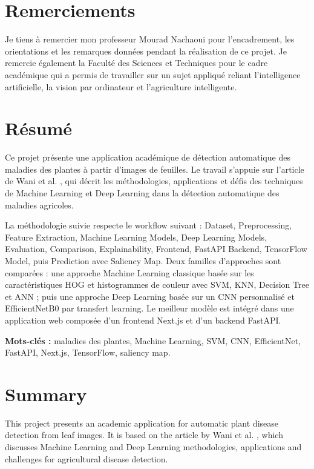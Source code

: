 \documentclass[12pt,a4paper]{report}
\begin{document}
\chapter*{Remerciements}

Je tiens à remercier mon professeur Mourad Nachaoui pour l'encadrement, les orientations et les remarques données pendant la réalisation de ce projet. Je remercie également la Faculté des Sciences et Techniques pour le cadre académique qui a permis de travailler sur un sujet appliqué reliant l'intelligence artificielle, la vision par ordinateur et l'agriculture intelligente.

\chapter*{Résumé}

Ce projet présente une application académique de détection automatique des maladies des plantes à partir d'images de feuilles. Le travail s'appuie sur l'article de Wani et al. \cite{wani2021}, qui décrit les méthodologies, applications et défis des techniques de Machine Learning et Deep Learning dans la détection automatique des maladies agricoles.

La méthodologie suivie respecte le workflow suivant : Dataset, Preprocessing, Feature Extraction, Machine Learning Models, Deep Learning Models, Evaluation, Comparison, Explainability, Frontend, FastAPI Backend, TensorFlow Model, puis Prediction avec Saliency Map. Deux familles d'approches sont comparées : une approche Machine Learning classique basée sur les caractéristiques HOG et histogrammes de couleur avec SVM, KNN, Decision Tree et ANN ; puis une approche Deep Learning basée sur un CNN personnalisé et EfficientNetB0 par transfert learning. Le meilleur modèle est intégré dans une application web composée d'un frontend Next.js et d'un backend FastAPI.

\textbf{Mots-clés :} maladies des plantes, Machine Learning, SVM, CNN, EfficientNet, FastAPI, Next.js, TensorFlow, saliency map.

\chapter*{Summary}

This project presents an academic application for automatic plant disease detection from leaf images. It is based on the article by Wani et al. \cite{wani2021}, which discusses Machine Learning and Deep Learning methodologies, applications and challenges for agricultural disease detection.
\end{document}
